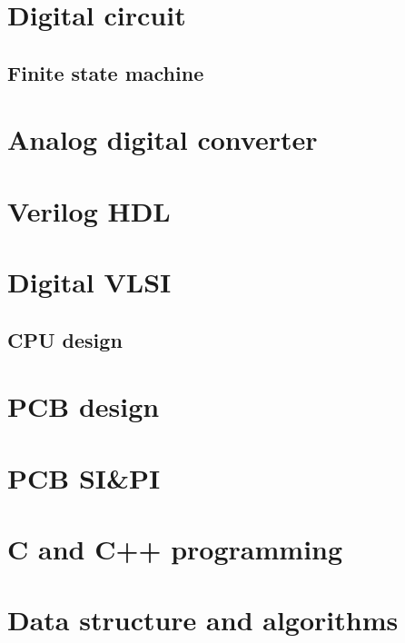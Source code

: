 \documentclass[UTF8]{ctexbook}
\begin{document}
	
	
	\part{Digital circuit}
	\label{Digital circuit}
	
	\begin{comment} 
	rather stupid, but helpful 
	\end{comment}
	
	\chapter{Finite state machine}
	\label{Finite state machine}
	
	\part{Analog digital converter}
	\label{Analog digital converter}
	
	\part{Verilog HDL}
	\label{Verilog HDL}
	
	\part{Digital VLSI}
	\label{Digital VLSI}
	\chapter{CPU design}
	\label{CPU design}
	
	\part{PCB design}
	\label{PCB design}
	
	\part{PCB SI\&PI}
	
	\part{C and C++ programming}
	
	\part{Data structure and algorithms}
	
\end{document}
